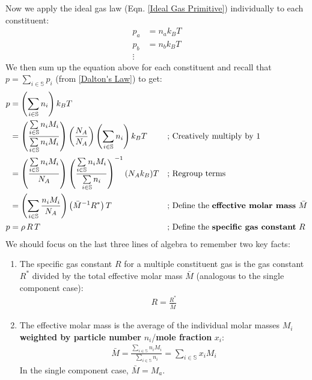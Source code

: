 Now we apply the ideal gas law (Eqn. \ref{Ideal Gas Primitive}) individually to each constituent:
\begin{align*}
    p_a&=n_ak_BT\\
    p_b&=n_bk_BT\\
    \vdots
\end{align*}
We then sum up the equation above for each constituent and recall that $p=\sum\limits_{i\in\mathbb{S}} p_i$ (from \ref{Dalton's Law}) to get:
\begin{align*}
    p&=\left(\sum\limits_{i\in\mathbb{S}} n_i\right)k_BT
    &&
    \\
    &= \left(\frac{\sum\limits_{i\in\mathbb{S}} n_iM_i}{\sum\limits_{i\in\mathbb{S}} n_iM_i}\right)\left(\frac{N_A}{N_A}\right)\left(\sum\limits_{i\in\mathbb{S}} n_i\right)k_BT
    &\text{; }&\text{Creatively multiply by }1
    \\
    &= \left(\frac{\sum\limits_{i\in\mathbb{S}} n_iM_i}{N_A}\right)\left(\frac{\sum\limits_{i\in\mathbb{S}} n_iM_i}{\sum\limits_{i\in\mathbb{S}} n_i}\right)^{-1}(N_Ak_B)T
    &\text{; }&\text{Regroup terms}
    \\
    &=\left(\sum\limits_{i\in\mathbb{S}}\frac{n_iM_i}{N_A}\right)\left(\bar{M}^{-1}R^*\right)T 
    &\text{; }&\text{Define the \textbf{effective molar mass} }\bar{M}
    \\
    p&=\rho\, R \,T
    &\text{; }&\text{Define the \textbf{specific gas constant} $R$}
\end{align*}
We should focus on the last three lines of algebra to remember two key facts:
\begin{enumerate}
    \item The specific gas constant $R$ for a multiple constituent gas is the gas constant $R^*$ divided by the total effective molar mass $\bar{M}$ (analogous to the single component case):
    \begin{align}
        R=\frac{R^*}{\bar{M}}
    \end{align}
    \item The effective molar mass is the average of the individual molar masses $M_i$ \textbf{weighted by particle number} $n_i$/\textbf{mole fraction} $x_i$:
    \begin{align}
        \boxed{\bar{M} =\frac{\sum\limits_{i\in\mathbb{S}} n_iM_i}{\sum\limits_{i\in\mathbb{S}} n_i}=\sum\limits_{i\in\mathbb{S}} x_iM_i}
    \end{align}
    In the single component case, $\bar{M}=M_a$.
\end{enumerate}

